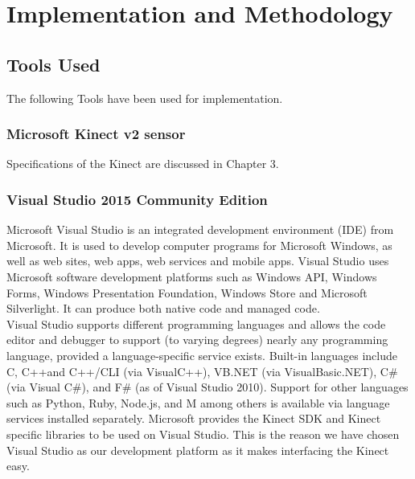 
\chapter{Implementation and Methodology} \label{Implementation and Methodology}

\section{Tools Used } \label{Tools Used }
\noindent The following Tools have been used for implementation.
\subsection{Microsoft Kinect v2 sensor} \label{Microsoft Kinect v2 sensor} 
\noindent Specifications of the Kinect are discussed in Chapter 3.
\subsection{Visual Studio 2015 Community Edition }\label{Visual Studio 2015 Community Edition }  
\noindent Microsoft Visual Studio is an integrated development environment (IDE) from Microsoft. It is used to develop computer programs for Microsoft Windows, as well as web sites, web apps, web services and mobile apps. Visual Studio uses Microsoft software development platforms such as Windows API, Windows Forms, Windows Presentation Foundation, Windows Store and Microsoft Silverlight. It can produce both native code and managed code.\\
\noindent Visual Studio supports different programming languages and allows the code editor and debugger to support (to varying degrees) nearly any programming language, provided a language-specific service exists. Built-in languages include C, C++and C++/CLI (via VisualC++), VB.NET (via VisualBasic.NET), C\# (via Visual C\#), and F\# (as of Visual Studio 2010). Support for other languages such as Python, Ruby, Node.js, and M among others is available via language services installed separately.
\noindent Microsoft provides the Kinect SDK and Kinect specific libraries to be used on Visual Studio. This is the reason we have chosen Visual Studio as our development platform as it makes interfacing the Kinect easy. 

